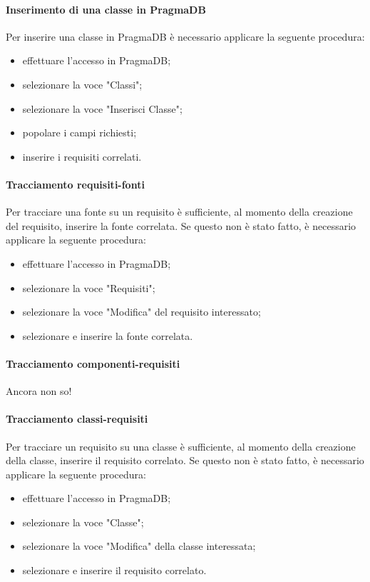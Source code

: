 \paragraph{Inserimento di una classe in PragmaDB}
 Per inserire una classe in PragmaDB è necessario applicare la seguente procedura:
 \begin{itemize}
 	\item effettuare l'accesso in PragmaDB;
 	\item selezionare la voce "Classi";
 	\item selezionare la voce "Inserisci Classe";
 	\item popolare i campi richiesti;
 	\item inserire i requisiti correlati.
 \end{itemize}
 \paragraph{Tracciamento requisiti-fonti}
 Per tracciare una fonte su un requisito è sufficiente, al momento della creazione del requisito, inserire la fonte correlata. Se questo non è stato fatto, è necessario applicare la seguente procedura:
 \begin{itemize}
 	\item effettuare l'accesso in PragmaDB;
 	\item selezionare la voce "Requisiti";
 	\item selezionare la voce "Modifica" del requisito interessato;
 	\item selezionare e inserire la fonte correlata.
 \end{itemize}
 \paragraph{Tracciamento componenti-requisiti}
 Ancora non so!
 \paragraph{Tracciamento classi-requisiti}
 Per tracciare un requisito su una classe è sufficiente, al momento della creazione della classe, inserire il requisito correlato. Se questo non è stato fatto, è necessario applicare la seguente procedura:
 \begin{itemize}
 	\item effettuare l'accesso in PragmaDB;
 	\item selezionare la voce "Classe";
 	\item selezionare la voce "Modifica" della classe interessata;
 	\item selezionare e inserire il requisito correlato.
 \end{itemize}
